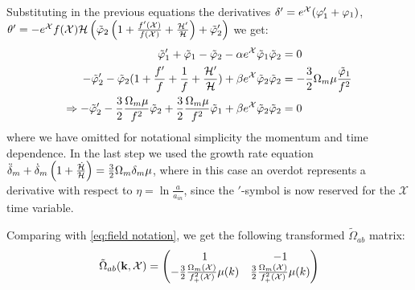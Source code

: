 Substituting in the previous equations the derivatives
$\delta'=e^{\mathcal{X}}(\varphi'_{1}+\varphi_{1})$, $\theta'=-e^{\mathcal{X}}f(\mathcal{X})\mathcal{H}\left(\tilde{\varphi}_{2}\left(1+
\frac{f'(\mathcal{X})}{f(\mathcal{X})}+\frac{\mathcal{H}'}{\mathcal{H}}\right)+\tilde{\varphi}'_{2}\right)$
we get:
\begin{align}
\tilde{\varphi}_{1}'+\tilde{\varphi}_{1}-\tilde{\varphi}_{2}-\alpha e^{\mathcal{X}}\tilde{\varphi}_{1}\tilde{\varphi}_{2} & =0\label{eq:varphi1}\\
-\tilde{\varphi}'_{2}-\tilde{\varphi}_{2}(1+\frac{f'}{f}+\frac{1}{f}+\frac{\mathcal{H}'}{\mathcal{H}})+\beta e^{\mathcal{X}}\tilde{\varphi}_{2}\tilde{\varphi}_{2} & =-\frac{3}{2}\Omega_{m}\mu\frac{\tilde{\varphi}_{1}}{f^{2}}\nonumber \\
\Rightarrow-\tilde{\varphi}'_{2}-\frac{3}{2}\frac{\Omega_{m}\mu}{f^{2}}\tilde{\varphi}_{2}+\frac{3}{2}\frac{\Omega_{m}\mu}{f^{2}}\tilde{\varphi}_{1}+\beta e^{\mathcal{X}}\tilde{\varphi}_{2}\tilde{\varphi}_{2} & =0\label{eq:varphi2}
\end{align}
where we have omitted for notational simplicity the momentum and time
dependence. In the last step we used the growth rate equation $\ddot{\delta}_{m}+\dot{\delta}_{m}\left(1+\frac{\dot{\mathcal{H}}}{\mathcal{H}}\right)=\frac{3}{2}\Omega_{m}\delta_{m}\mu$,
where in this case an overdot represents a derivative with respect
to $\eta=\ln\frac{a}{a_{in}}$, since the $'$-symbol is now reserved
for the $\mathcal{X}$ time variable.

Comparing  with \ref{eq:field notation},
we get the following transformed $\tilde{\Omega}_{ab}$ matrix: 
\begin{equation}\label{eq:omegamatrix-horn}
\tilde{\Omega}_{ab} (\mathbf{k},\mathcal{X})=\begin{pmatrix}1 & -1\\
-\frac{3}{2}\frac{\Omega_{m}(\mathcal{X})}{f_{+}^{2}(\mathcal{X})}\mu(k) & \frac{3}{2}\frac{\Omega_{m}(\mathcal{X})}{f_{+}^{2}(\mathcal{X})}\mu(k)
\end{pmatrix}
\end{equation}


